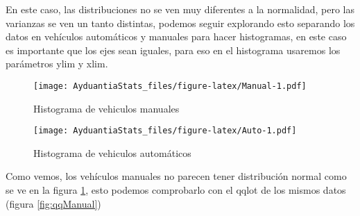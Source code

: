 \documentclass[]{book}
\newenvironment{Shaded}{\begin{snugshade}}{\end{snugshade}}
\newcommand{\DataTypeTok}[1]{\textcolor[rgb]{0.13,0.29,0.53}{#1}}
\newcommand{\DecValTok}[1]{\textcolor[rgb]{0.00,0.00,0.81}{#1}}
\newcommand{\KeywordTok}[1]{\textcolor[rgb]{0.13,0.29,0.53}{\textbf{#1}}}
\newcommand{\NormalTok}[1]{#1}
\newcommand{\OperatorTok}[1]{\textcolor[rgb]{0.81,0.36,0.00}{\textbf{#1}}}
\begin{document}
En este caso, las distribuciones no se ven muy diferentes a la normalidad, pero las varianzas se ven un tanto distintas, podemos seguir explorando esto separando los datos en vehículos automáticos y manuales para hacer histogramas, en este caso es importante que los ejes sean iguales, para eso en el histograma usaremos los parámetros ylim y xlim.

\begin{Shaded}
\end{Shaded}

\begin{figure}
\centering
\texttt{[image: AyduantiaStats\_files/figure-latex/Manual-1.pdf]}
\caption{\label{fig:Manual}Histograma de vehiculos manuales}
\end{figure}

\begin{Shaded}
\end{Shaded}

\begin{figure}
\centering
\texttt{[image: AyduantiaStats\_files/figure-latex/Auto-1.pdf]}
\caption{\label{fig:Auto}Histograma de vehiculos automáticos}
\end{figure}

Como vemos, los vehículos manuales no parecen tener distribución normal como se ve en la figura \ref{fig:Manual}, esto podemos comprobarlo con el qqlot de los mismos datos (figura \ref{fig:qqManual})

\begin{Shaded}
\end{Shaded}
\end{document}
